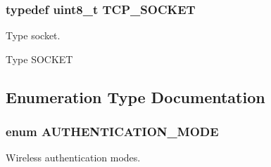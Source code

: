 \subsubsection[{\texorpdfstring{T\+C\+P\+\_\+\+S\+O\+C\+K\+ET}{TCP_SOCKET}}]{\setlength{\rightskip}{0pt plus 5cm}typedef uint8\+\_\+t {\bf T\+C\+P\+\_\+\+S\+O\+C\+K\+ET}}\hypertarget{group__wireless__interface_gab2d7ad3f99c2b04b0f5f5a77eefc5355}{}\label{group__wireless__interface_gab2d7ad3f99c2b04b0f5f5a77eefc5355}


Type socket. 

Type S\+O\+C\+K\+ET 

\subsection{Enumeration Type Documentation}
\subsubsection[{\texorpdfstring{A\+U\+T\+H\+E\+N\+T\+I\+C\+A\+T\+I\+O\+N\+\_\+\+M\+O\+DE}{AUTHENTICATION_MODE}}]{\setlength{\rightskip}{0pt plus 5cm}enum {\bf A\+U\+T\+H\+E\+N\+T\+I\+C\+A\+T\+I\+O\+N\+\_\+\+M\+O\+DE}}\hypertarget{group__wireless__interface_gab857a286e4eb7fe1039f12ab48d4a3be}{}\label{group__wireless__interface_gab857a286e4eb7fe1039f12ab48d4a3be}


Wireless authentication modes. 

